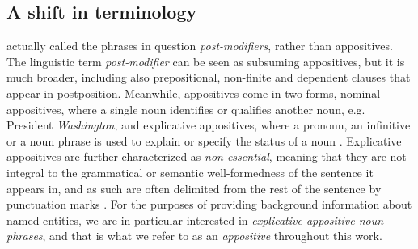 \documentclass[11pt]{article}
\newcommand{\yktodo}[1]{\todo[color=green!20]{#1}}
\newcommand{\dltodo}[1]{\todo[color=yellow!20]{#1}}
\begin{document}
\subsection{A shift in terminology}
 actually called the phrases in question \textit{post-modifiers}, rather than appositives. %
The linguistic term \textit{post-modifier} can be seen as subsuming appositives, but it is much broader, including also prepositional, non-finite and dependent clauses that appear in postposition. Meanwhile, appositives come in two forms, nominal appositives, where a single noun identifies or qualifies another noun, e.g. President \textit{Washington}, and explicative appositives, where a pronoun, an infinitive or a noun phrase is used to explain or specify the status of a noun \cite{bauer2017nominal}. Explicative appositives are further characterized as \textit{non-essential}, meaning that they are not integral to the grammatical or semantic well-formedness of the sentence it appears in, and as such are often delimited from the rest of the sentence by punctuation marks \cite{traffis_2019}. For the purposes of providing background information about named entities, we are in particular interested in \textit{explicative appositive noun phrases}, and that is what we refer to as an \textit{appositive} throughout this work. 
\end{document}
